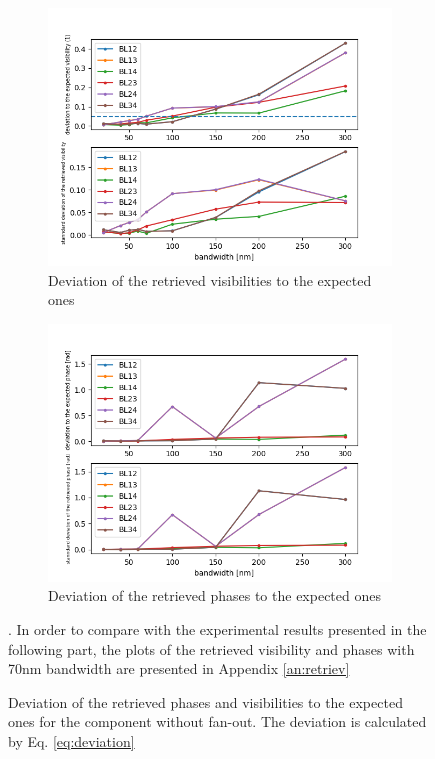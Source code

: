 \begin{figure}[htbp]
    \centering
    \begin{subfigure}{.45\textwidth}
        \includegraphics[scale=.45]{picture/retrieval_simu/visi_retrieved_nofan.png}
        \caption{Deviation of the retrieved visibilities to the expected ones}
    \end{subfigure}%
    \begin{subfigure}{.45\textwidth}
    \includegraphics[scale=.45]{picture/retrieval_simu/phase_retrieved_nofan.png}
    \caption{Deviation of the retrieved phases to the expected ones}
    \end{subfigure}
    \caption{Deviation of the retrieved phases and visibilities to the expected ones for the component without fan-out. The deviation is calculated by Eq. \ref{eq:deviation}}. In order to compare with the experimental results presented in the following part, the plots of the retrieved visibility and phases with 70nm bandwidth are presented in Appendix \ref{an:retriev}
    \label{fig:retrieved_nofan}
\end{figure}

